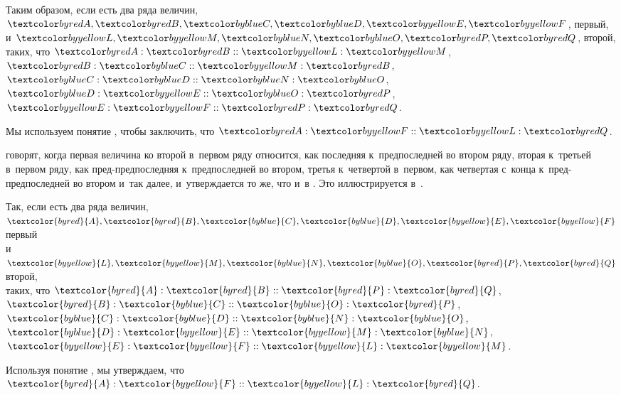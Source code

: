 \documentclass[letters]{byrne-book}
\begin{document}
\begin{center}
Таким образом, если есть два ряда величин,\\
$\varA, \varB, \varC, \varD, \varE, \varF$, первый,\\
и $\varL, \varM, \varN, \varO, \varP, \varQ$, второй,\\
таких, что $\varA : \varB :: \varL : \varM$, $\varB : \varC :: \varM : \varB$, $\varC : \varD :: \varN : \varO$, $\varD : \varE :: \varO : \varP$, $\varE : \varF :: \varP : \varQ$.

Мы используем понятие , чтобы заключить, что $\varA : \varF :: \varL : \varQ$.
\end{center}


\vfill\pagebreak

\label{def:V.XX}
\def\varA{\textcolor{byred}{A}}
\def\varB{\textcolor{byred}{B}}
\def\varC{\textcolor{byblue}{C}}
\def\varD{\textcolor{byblue}{D}}
\def\varE{\textcolor{byyellow}{E}}
\def\varF{\textcolor{byyellow}{F}}
\def\varL{\textcolor{byyellow}{L}}
\def\varM{\textcolor{byyellow}{M}}
\def\varN{\textcolor{byblue}{N}}
\def\varO{\textcolor{byblue}{O}}
\def\varP{\textcolor{byred}{P}}
\def\varQ{\textcolor{byred}{Q}}
 говорят, когда первая величина ко второй в~первом ряду относится, как последняя к~предпоследней во втором ряду, вторая к~третьей в~первом ряду, как пред-предпоследняя к~предпоследней во втором, третья к~четвертой в~первом, как четвертая с~конца к~пред-предпоследней во втором и~так далее, и~утверждается то же, что и~в . Это иллюстрируется в~.

\begin{center}
Так, если есть два ряда величин,\\
$\varA, \varB, \varC, \varD, \varE, \varF$ первый\\
и $\varL, \varM, \varN, \varO, \varP, \varQ$ второй,\\
таких, что $\varA : \varB :: \varP : \varQ$, $\varB : \varC :: \varO : \varP$, $\varC : \varD :: \varN : \varO$, $\varD : \varE :: \varM : \varN$, $\varE : \varF :: \varL : \varM$.

Используя понятие , мы утверждаем, что $\varA : \varF :: \varL : \varQ$.
\end{center}


\vfill\pagebreak

\label{prop:V.XX}
\end{document}
